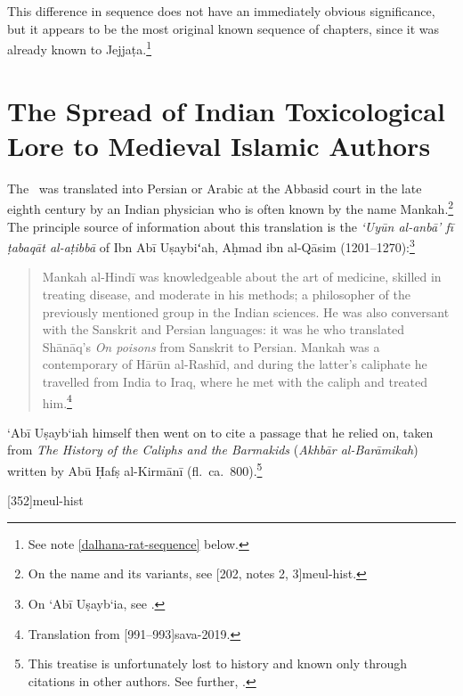 
\noindent
This difference in sequence does not have an immediately obvious 
significance, but it appears to be the most original known sequence of 
chapters, since it was already known to Jejjaṭa.\footnote{See note 
\ref{dalhana-rat-sequence} below.}

\section{The Spread of Indian Toxicological Lore to Medieval Islamic  
Authors}

The \SS\ was translated into Persian or Arabic at the Abbasid court in
the late eighth century by an Indian physician who is often known by
the name Mankah.\footnote{On the name and its variants, see
    [202, notes 2, 3]{meul-hist}.}  The principle source of
    information about this translation is the 
    \emph{`Uyūn al-anbā' fī ṭabaqāt al-aṭibbā} of Ibn Abī Uṣaybiʻah, Aḥmad ibn 
    al-Qāsim
    (1201--1270):\footnote{On `Abī
        Uṣayb`ia, see \cite{hill-2019}.}
\begin{quote}
    Mankah al-Hindī  was knowledgeable about the art of medicine,
skilled in treating disease, and moderate in his methods; a
philosopher of the previously mentioned group in the Indian
sciences. He was also conversant with the Sanskrit and Persian
languages: it was he who translated Shānāq’s \emph{On poisons}
from Sanskrit to Persian. Mankah was a contemporary of Hārūn
al-Rashīd, and during the latter’s caliphate he travelled from
India to Iraq, where he met with the caliph and treated 
him.\footnote{Translation from [991--993]{sava-2019}.}
\end{quote}
`Abī Uṣayb`iah himself then went on to cite a passage that he relied on, taken 
from  
\emph{The History of the Caliphs and the Barmakids}  (\emph{Akhbār 
al-Barāmikah}) written by  Abū Ḥafṣ 
al-Kirmānī (fl.\ ca.\ 800).\footnote{This treatise is unfortunately lost to history and 
known only 
through citations in other authors.   See further, \cite{bosw-1994,blad-2011}.}


[352]{meul-hist}
\cite{lang-2018}

